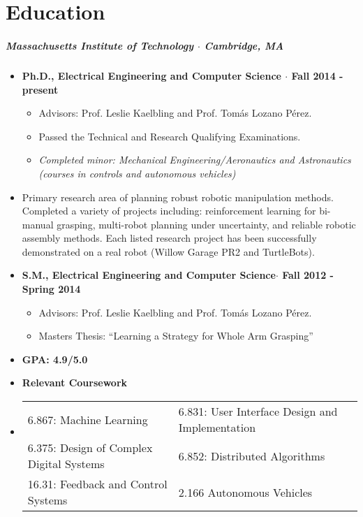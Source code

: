 \documentclass[10pt,letterpaper]{article}
\begin{document}
\section*{Education}
 \subparagraph{Massachusetts Institute of Technology $\cdot$ Cambridge, MA}

\begin{itemize}
    \item {\bf Ph.D., Electrical Engineering and Computer Science $\cdot$ Fall 2014 - present}
 	\begin{itemize}
        \item Advisors: Prof. Leslie Kaelbling and Prof. Tom\'as Lozano P\'erez.
        \item Passed the Technical and Research Qualifying Examinations.
        \item {\em Completed minor: Mechanical Engineering/Aeronautics and Astronautics\\
                (courses in controls and autonomous vehicles)}
	\end{itemize}
\item Primary research area of planning robust robotic manipulation methods. Completed a variety of projects including: reinforcement learning for bi-manual grasping, multi-robot planning under uncertainty, and reliable robotic assembly methods. Each listed research project has been successfully demonstrated on a real robot (Willow Garage PR2 and TurtleBots).   
\end{itemize}

\begin{itemize}
 	\item {\bf S.M., Electrical Engineering and Computer Science$\cdot$ Fall 2012 - Spring 2014}
    \begin{itemize}
	    \item Advisors: Prof. Leslie Kaelbling and Prof. Tom\'as Lozano P\'erez.
	    \item Masters Thesis: ``Learning a Strategy for Whole Arm Grasping''
	\end{itemize}
\end{itemize}

\begin{itemize}
    \item {\bf GPA:  4.9/5.0 }
	\item {\bf Relevant Coursework}
    \item
    \begin{tabularx}{\textwidth}{l l}
      6.867: Machine Learning 
      & \hfill 6.831: User Interface Design and Implementation\\
      6.375: Design of Complex Digital Systems
      & \hfill 6.852: Distributed Algorithms\\
      16.31: Feedback and Control Systems
      & \hfill 2.166 Autonomous Vehicles\\
     \end{tabularx}
\end{itemize}
\end{document}
